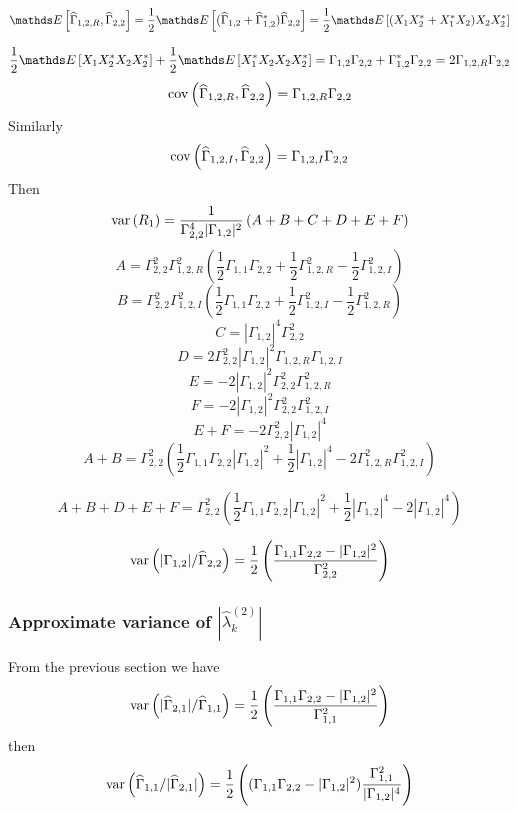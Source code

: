 $$
 \esp{\hat\Gamma_{1,2,R},\hat\Gamma_{2,2}}
 =
 \frac{1}{2}\esp{(\hat\Gamma_{1,2}+\hat\Gamma_{1,2}^{*})\hat\Gamma_{2,2}}
 =
 \frac{1}{2}\esp{(X_{1}X_{2}^{*}+X_{1}^{*}X_{2})X_{2}X_{2}^{*}}
$$

$$
\frac{1}{2}\esp{X_{1}X_{2}^{*} X_{2}X_{2}^{*}}
+
\frac{1}{2}\esp{X_{1}^{*}X_{2} X_{2}X_{2}^{*}}
=\Gamma_{1,2}\Gamma_{2,2}+\Gamma_{1,2}^{*}\Gamma_{2,2}
=
2\Gamma_{1,2,R}\Gamma_{2,2}
$$
$$
 \mathrm{cov}\left( \widehat\Gamma_{1,2,R},\widehat\Gamma_{2,2} \right)=
 \Gamma_{1,2,R}\Gamma_{2,2}
$$
Similarly
$$
 \mathrm{cov}\left( \widehat\Gamma_{1,2,I},\widehat\Gamma_{2,2} \right)=
 \Gamma_{1,2,I}\Gamma_{2,2}
$$
Then
\begin{eqnarray}
 \mathrm{var}\left( R_{1} \right) = \frac{1}{\Gamma_{2,2}^{4}|\Gamma_{1,2}|^{2}}
 \left(
 A+B+C+D+E+F
 \right)
\end{eqnarray}
$$
 A =\Gamma_{2,2}^{2}\Gamma_{1,2,R}^{2}
 \left(
  \frac{1}{2}\Gamma_{1,1}\Gamma_{2,2}+\frac{1}{2}\Gamma_{1,2,R}^{2}-\frac{1}{2}\Gamma_{1,2,I}^{2}
  \right)
$$
$$
 B =\Gamma_{2,2}^{2}\Gamma_{1,2,I}^{2}
 \left(
\frac{1}{2}\Gamma_{1,1}\Gamma_{2,2}+\frac{1}{2} \Gamma_{1,2,I}^{2}-\frac{1}{2}\Gamma_{1,2,R}^{2}
   \right)
$$
$$
 C = |\Gamma_{1,2}|^{4}\Gamma_{2,2}^{2}
$$
$$
 D = 2\Gamma_{2,2}^{2}|\Gamma_{1,2}|^{2}\Gamma_{1,2,R}\Gamma_{1,2,I}
$$
$$
 E = -2|\Gamma_{1,2}|^{2}\Gamma_{2,2}^{2}\Gamma_{1,2,R}^{2}
$$
$$
 F = -2|\Gamma_{1,2}|^{2}\Gamma_{2,2}^{2}\Gamma_{1,2,I}^{2}
$$
$$
 E+F = -2\Gamma_{2,2}^{2}|\Gamma_{1,2}|^{4}
$$
$$
 A+B = \Gamma_{2,2}^{2}
 \left(
 \frac{1}{2}\Gamma_{1,1}\Gamma_{2,2}|\Gamma_{1,2}|^{2}
 +
 \frac{1}{2}|\Gamma_{1,2}|^{4}
 -2\Gamma_{1,2,R}^{2}\Gamma_{1,2,I}^{2}
 \right)
$$

$$
 A+B+D+E+F = \Gamma_{2,2}^{2}
 \left(
 \frac{1}{2}\Gamma_{1,1}\Gamma_{2,2}|\Gamma_{1,2}|^{2}
 +
 \frac{1}{2}|\Gamma_{1,2}|^{4}-2|\Gamma_{1,2}|^{4}
 \right)
$$

\begin{eqnarray*}
 \mathrm{var}\left( |\Gamma_{1,2}|/\widehat\Gamma_{2,2} \right) =\frac{1}{2}
 \left(
  \frac{\Gamma_{1,1}\Gamma_{2,2}-|\Gamma_{1,2}|^{2}}
  {\Gamma_{2,2}^{2}}
 \right)
\end{eqnarray*} 
 

\subsubsection{Approximate variance of $|\hat\lambda_{k}^{(2)}|$}%
From the previous section we have
\begin{eqnarray*}
 \mathrm{var}\left( |\widehat\Gamma_{2,1}|/\widehat\Gamma_{1,1} \right) =\frac{1}{2}
 \left(
  \frac{\Gamma_{1,1}\Gamma_{2,2}-|\Gamma_{1,2}|^{2}}
  {\Gamma_{1,1}^{2}}
 \right)
\end{eqnarray*} 
then
\begin{eqnarray*}
 \mathrm{var}\left( \widehat\Gamma_{1,1}/|\widehat\Gamma_{2,1}| \right) =\frac{1}{2}
 \left(
  (\Gamma_{1,1}\Gamma_{2,2}-|\Gamma_{1,2}|^{2})
  \frac{\Gamma_{1,1}^{2}}{|\Gamma_{1,2}|^{4}}
 \right)
\end{eqnarray*} 

